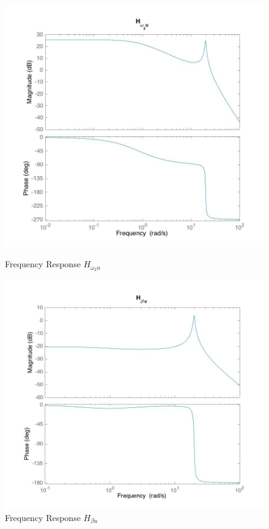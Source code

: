 \documentclass[11pt,titlepage]{article}
\begin{document}
       \begin{figure}[H]
            \centering
            \begin{minipage}{.5\textwidth}
                \centering
              	\includegraphics[trim={2cm 0 0 0},clip,origin=c,scale=0.25]{w2_bode}
            	\caption{Frequency Response $H_{\omega_{2}u}$}
           	\label{fig:disc_sys}
            \end{minipage}%
            \begin{minipage}{.5\textwidth}
                \centering
                \includegraphics[trim={2cm 0 0 0},clip,origin=c,scale=0.25]{B_bode}
            \caption{Frequency Response $H_{\beta u}$}
            \label{fig:disc_sys}
            \end{minipage}%
       \end{figure}
	
\section{}
\end{document}
